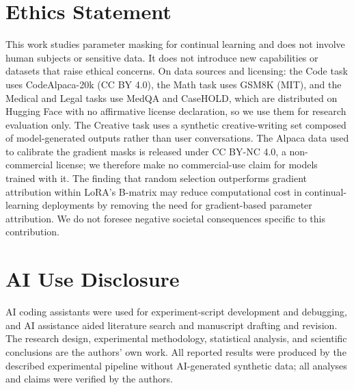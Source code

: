 \section*{Ethics Statement}

This work studies parameter masking for continual learning and does not involve human subjects or sensitive data. It does not introduce new capabilities or datasets that raise ethical concerns. On data sources and licensing: the Code task uses CodeAlpaca-20k (CC BY 4.0), the Math task uses GSM8K (MIT), and the Medical and Legal tasks use MedQA and CaseHOLD, which are distributed on Hugging Face with no affirmative license declaration, so we use them for research evaluation only. The Creative task uses a synthetic creative-writing set composed of model-generated outputs rather than user conversations. The Alpaca data used to calibrate the gradient masks is released under CC BY-NC 4.0, a non-commercial license; we therefore make no commercial-use claim for models trained with it. The finding that random selection outperforms gradient attribution within LoRA's B-matrix may reduce computational cost in continual-learning deployments by removing the need for gradient-based parameter attribution. We do not foresee negative societal consequences specific to this contribution.

\section*{AI Use Disclosure}

AI coding assistants were used for experiment-script development and debugging, and AI assistance aided literature search and manuscript drafting and revision. The research design, experimental methodology, statistical analysis, and scientific conclusions are the authors' own work. All reported results were produced by the described experimental pipeline without AI-generated synthetic data; all analyses and claims were verified by the authors.
